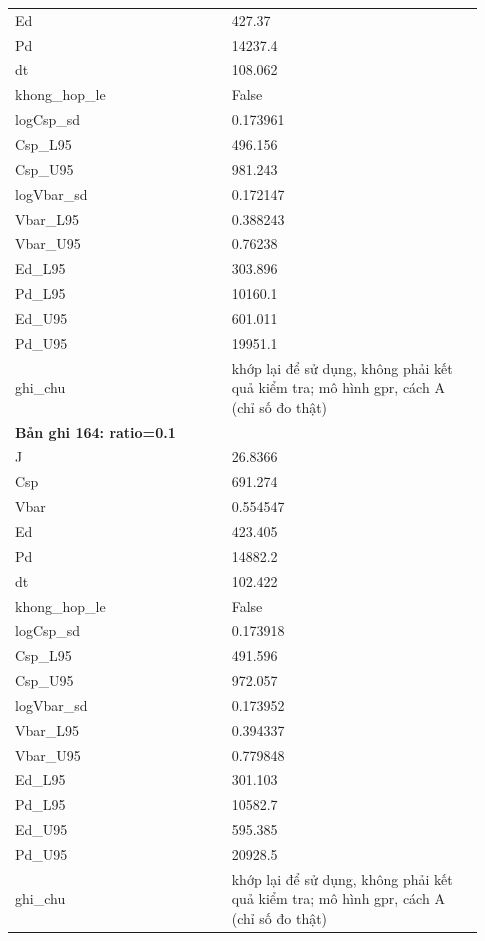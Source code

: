 \begin{longtable}{p{0.43\linewidth}p{0.50\linewidth}}
Ed & 427.37 \\
Pd & 14237.4 \\
dt & 108.062 \\
khong\_\allowbreak hop\_\allowbreak le & False \\
logCsp\_\allowbreak sd & 0.173961 \\
Csp\_\allowbreak L95 & 496.156 \\
Csp\_\allowbreak U95 & 981.243 \\
logVbar\_\allowbreak sd & 0.172147 \\
Vbar\_\allowbreak L95 & 0.388243 \\
Vbar\_\allowbreak U95 & 0.76238 \\
Ed\_\allowbreak L95 & 303.896 \\
Pd\_\allowbreak L95 & 10160.1 \\
Ed\_\allowbreak U95 & 601.011 \\
Pd\_\allowbreak U95 & 19951.1 \\
ghi\_\allowbreak chu & khớp lại để sử dụng, không phải kết quả kiểm tra; mô hình gpr, cách A (chỉ số đo thật) \\
\midrule
\multicolumn{2}{p{0.95\linewidth}}{\textbf{Bản ghi 164: ratio=0.1}} \\
J & 26.8366 \\
Csp & 691.274 \\
Vbar & 0.554547 \\
Ed & 423.405 \\
Pd & 14882.2 \\
dt & 102.422 \\
khong\_\allowbreak hop\_\allowbreak le & False \\
logCsp\_\allowbreak sd & 0.173918 \\
Csp\_\allowbreak L95 & 491.596 \\
Csp\_\allowbreak U95 & 972.057 \\
logVbar\_\allowbreak sd & 0.173952 \\
Vbar\_\allowbreak L95 & 0.394337 \\
Vbar\_\allowbreak U95 & 0.779848 \\
Ed\_\allowbreak L95 & 301.103 \\
Pd\_\allowbreak L95 & 10582.7 \\
Ed\_\allowbreak U95 & 595.385 \\
Pd\_\allowbreak U95 & 20928.5 \\
ghi\_\allowbreak chu & khớp lại để sử dụng, không phải kết quả kiểm tra; mô hình gpr, cách A (chỉ số đo thật) \\

\end{longtable}
